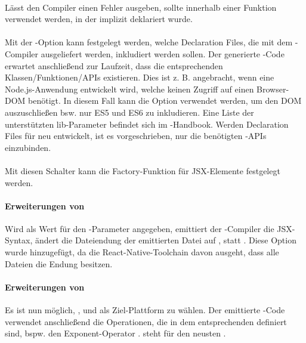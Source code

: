 \paragraph{}
Lässt den Compiler einen Fehler ausgeben, sollte \tsthis innerhalb einer Funktion verwendet werden, in der \tsthis implizit deklariert wurde.

\paragraph{}
Mit der -Option kann festgelegt werden, welche Declaration Files, die mit dem \ts-Compiler ausgeliefert werden, inkludiert werden sollen. Der generierte \js-Code erwartet anschließend zur Laufzeit, dass die entsprechenden Klassen/Funktionen/APIs existieren. Dies ist z. B. angebracht, wenn eine Node.js-Anwendung entwickelt wird, welche keinen Zugriff auf einen Browser-DOM benötigt. In diesem Fall kann die Option  verwendet werden, um den DOM auszuschließen bsw. nur ES5 und ES6 zu inkludieren. Eine Liste der unterstützten lib-Parameter befindet sich im \ts-Handbook. Werden Declaration Files für \dt neu entwickelt, ist es vorgeschrieben, nur die benötigten \js-APIs einzubinden.

\paragraph{}
Mit diesen Schalter kann die Factory-Funktion für JSX-Elemente festgelegt werden.

\paragraph{Erweiterungen von }
Wird  als Wert für den -Parameter angegeben, emittiert der \ts-Com\-pi\-ler die JSX-Syntax, ändert die Dateiendung der emittierten Datei auf , statt . Diese Option wurde hinzugefügt, da die React-Native-Toolchain davon ausgeht, dass alle Dateien die Endung  besitzen.

\paragraph{Erweiterungen von }
Es ist nun möglich, ,  und  als Ziel-Plattform zu wählen. Der emittierte \js-Code verwendet anschließend die Operationen, die in dem entsprechenden \ess definiert sind, bspw. den Exponent-Operator \tsin{**}.  steht für den neusten \ess{}.

